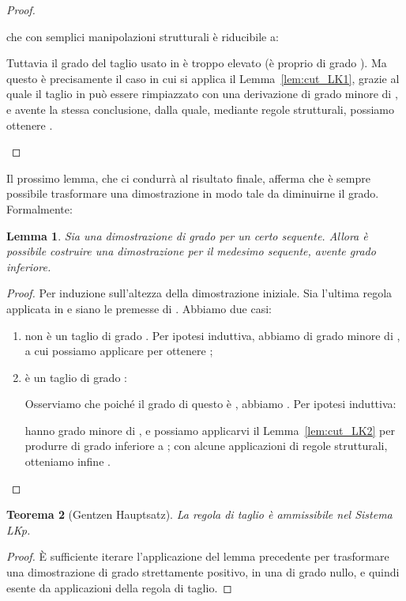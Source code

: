 \documentclass[12pt,a4paper,openright,twoside]{report}
\newtheorem{thm}{Teorema}[section]
\newtheorem{lem}[thm]{Lemma}
\begin{document}
\begin{proof}
\begin{enumerate}
che con semplici manipolazioni strutturali \`e riducibile a: 

Tuttavia il grado del taglio usato in  \`e troppo elevato (\`e proprio di grado ). Ma questo \`e precisamente il caso in cui si applica il Lemma~\ref{lem:cut_LK1}, grazie al quale il taglio in  pu\`o essere rimpiazzato con una derivazione di grado minore di , e avente la stessa conclusione, dalla quale, mediante regole strutturali, possiamo ottenere .
\end{enumerate}
\end{proof}

Il prossimo lemma, che ci condurr\`a al risultato finale, afferma che \`e sempre possibile trasformare una dimostrazione in modo tale da diminuirne il grado. Formalmente:

\begin{lem}\label{lem:cut_LK3}
Sia  una dimostrazione di grado  per un certo sequente. Allora \`e possibile costruire una dimostrazione  per il medesimo sequente, avente grado inferiore.
\end{lem}
\begin{proof}
Per induzione sull'altezza  della dimostrazione iniziale. Sia  l'ultima regola applicata in  e siano  le premesse di . Abbiamo due casi:
\begin{enumerate}
	\item  non \`e un taglio di grado . Per ipotesi induttiva, abbiamo  di grado minore di , a cui possiamo applicare  per ottenere ;
	\item  \`e un taglio di grado :
	
	Osserviamo che poich\'e il grado di questo  \`e , abbiamo . Per ipotesi induttiva:
	
	hanno grado minore di , e possiamo applicarvi il Lemma~\ref{lem:cut_LK2} per produrre  di grado inferiore a ; con alcune applicazioni di regole strutturali, otteniamo infine .
\end{enumerate}
\end{proof}

\begin{thm}[Gentzen Hauptsatz]\label{thm:haupt_lk}
La regola di taglio \`e ammissibile nel Sistema \textsf{LKp}.
\end{thm}
\begin{proof}
\`E sufficiente iterare l'applicazione del lemma precedente per trasformare una dimostrazione di grado strettamente positivo, in una di grado nullo, e quindi esente da applicazioni della regola di taglio.
\end{proof}
\end{document}
